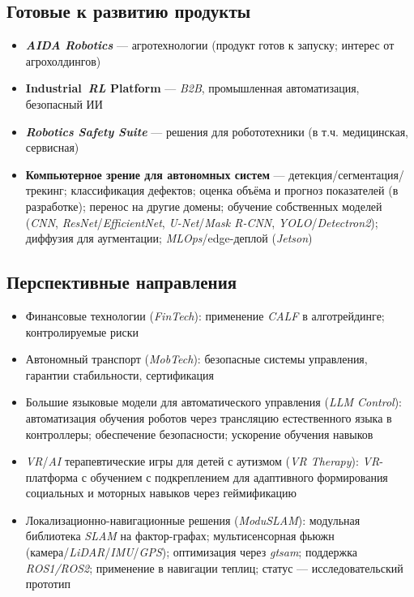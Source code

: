 \documentclass[12pt,a4paper]{article}
\begin{document}
\subsection*{Готовые к развитию продукты}
\begin{itemize}
    \item \textbf{\textit{AIDA Robotics}} --- агротехнологии (продукт готов к запуску; интерес от агрохолдингов)
    \item \textbf{Industrial~\textit{RL} Platform} --- \textit{B2B}, промышленная автоматизация, безопасный ИИ
    \item \textbf{\textit{Robotics Safety Suite}} --- решения для робототехники (в т.ч. медицинская, сервисная)
    \item \textbf{Компьютерное зрение для автономных систем} --- детекция/сегментация/трекинг; классификация дефектов; оценка объёма и прогноз показателей (в разработке); перенос на другие домены; обучение собственных моделей (\textit{CNN}, \textit{ResNet}/\textit{EfficientNet}, \textit{U-Net}/\textit{Mask R-CNN}, \textit{YOLO}/\textit{Detectron2}); диффузия для аугментации; \textit{MLOps}/edge-деплой (\textit{Jetson})
\end{itemize}

\subsection*{Перспективные направления}
\begin{itemize}
    \item Финансовые технологии (\textit{FinTech}): применение \textit{CALF} в алготрейдинге; контролируемые риски
    \item Автономный транспорт (\textit{MobTech}): безопасные системы управления, гарантии стабильности, сертификация
    \item Большие языковые модели для автоматического управления (\textit{LLM Control}): автоматизация обучения роботов через трансляцию естественного языка в контроллеры; обеспечение безопасности; ускорение обучения навыков
    \item \textit{VR}/\textit{AI} терапевтические игры для детей с аутизмом (\textit{VR Therapy}): \textit{VR}-платформа с обучением с подкреплением для адаптивного формирования социальных и моторных навыков через геймификацию
    \item Локализационно-навигационные решения (\textit{ModuSLAM}): модульная библиотека \textit{SLAM} на фактор-графах; мультисенсорная фьюжн (камера/\textit{LiDAR}/\textit{IMU}/\textit{GPS}); оптимизация через \textit{gtsam}; поддержка \textit{ROS1/ROS2}; применение в навигации теплиц; статус --- исследовательский прототип

\end{itemize}
\end{document}
